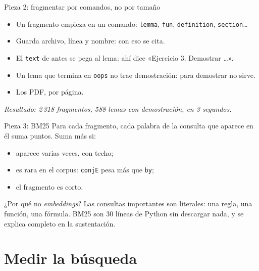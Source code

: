 \documentclass[10pt]{beamer}
\newcommand{\nota}[1]{{\small\itshape\color{psCom} #1}}
\newcommand{\cd}[1]{\texttt{#1}}
\begin{document}
\begin{frame}{Pieza 2: fragmentar por comandos, no por tamaño}
  \begin{itemize}
    \item Un fragmento empieza en un comando: \cd{lemma}, \cd{fun},
      \cd{definition}, \cd{section}\ldots
    \item Guarda archivo, línea y nombre: con eso se cita.
    \item El \cd{text} de antes \alert{se pega al lema}: ahí dice
      «Ejercicio 3. Demostrar \ldots».
    \item Un lema que termina en \cd{oops} no trae demostración: para
      demostrar no sirve.
    \item Los PDF, por página.
  \end{itemize}
  \vspace{0.4em}
  \nota{Resultado: 2\,318 fragmentos, 588 lemas con demostración, en 3
  segundos.}
\end{frame}

\begin{frame}{Pieza 3: BM25}
  Para cada fragmento, cada palabra de la consulta que aparece en él suma
  puntos. Suma más si:
  \begin{itemize}
    \item aparece varias veces, con techo;
    \item es \alert{rara} en el corpus: \cd{conjE} pesa más que \cd{by};
    \item el fragmento es corto.
  \end{itemize}
  \vspace{0.4em}
  \begin{block}{¿Por qué no \emph{embeddings}?}
    Las consultas importantes son literales: una regla, una función, una
    fórmula. BM25 son 30 líneas de Python sin descargar nada, y se explica
    completo en la sustentación.
  \end{block}
\end{frame}

\section{Medir la búsqueda}
\end{document}
